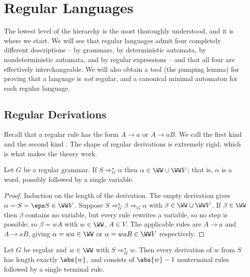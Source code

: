 \section{Regular Languages}\label{sec:regular}

The lowest level of the hierarchy is the most thoroughly understood, and it is where we start. We will see that regular languages admit four completely different descriptions -- by grammars, by deterministic automata, by nondeterministic automata, and by regular expressions -- and that all four are effectively interchangeable. We will also obtain a tool (the pumping lemma) for proving that a language is \emph{not} regular, and a canonical minimal automaton for each regular language.

\subsection{Regular Derivations}

Recall that a regular rule has the form $A \to a$ or $A \to aB$. We call the first kind  and the second kind . The shape of regular derivations is extremely rigid, which is what makes the theory work.

\begin{lemma}\label{lem:regularform}
	Let $G$ be a regular grammar. If $S \Rightarrow_G^\star \alpha$ then $\alpha \in \WW \cup \WW V$; that is, $\alpha$ is a word, possibly followed by a single variable.
\end{lemma}

\begin{proof}
	Induction on the length of the derivation. The empty derivation gives $\alpha = S = \eps S \in \WW V$. Suppose $S \Rightarrow_G^\star \beta \Rightarrow_G \alpha$ with $\beta \in \WW \cup \WW V$. If $\beta \in \WW$ then $\beta$ contains no variable, but every rule rewrites a variable, so no step is possible; so $\beta = wA$ with $w \in \WW$, $A \in V$. The applicable rules are $A \to a$ and $A \to aB$, giving $\alpha = wa \in \WW$ or $\alpha = waB \in \WW V$ respectively.
\end{proof}

\begin{lemma}\label{lem:regularlength}
	Let $G$ be regular and $w \in \WW$ with $S \Rightarrow_G^\star w$. Then every derivation of $w$ from $S$ has length exactly $\abs{w}$, and consists of $\abs{w} - 1$ nonterminal rules followed by a single terminal rule.
\end{lemma}

